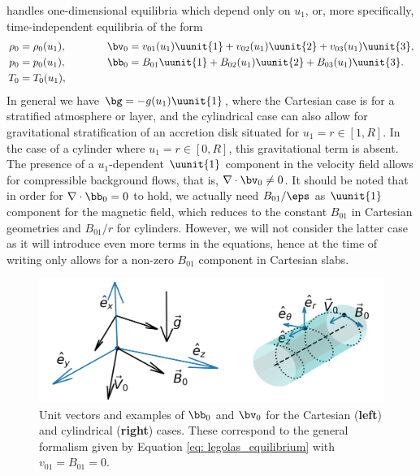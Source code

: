 {\legolas} handles one-dimensional equilibria which depend only on $u_1$, or, more specifically, time-independent equilibria of the form
\begin{equation}	\label{eq: legolas_equilibrium}
	\begin{aligned}
		\rho_0 &= \rho_0(u_1),		\\
		p_0 &= p_0(u_1),			\\
		T_0 &= T_0(u_1),			\\
	\end{aligned}
	\qquad\qquad
	\begin{aligned}
		\bv_0 &= v_{01}(u_1)\uunit{1} + v_{02}(u_1)\uunit{2} + v_{03}(u_1)\uunit{3},	\\
		\bb_0 &= B_{01}\uunit{1} + B_{02}(u_1)\uunit{2} + B_{03}(u_1)\uunit{3}. \\
		&
	\end{aligned}
\end{equation}
In general we have $\bg = -g(u_1)\uunit{1}$, where the Cartesian case is for a stratified atmosphere or layer, and the cylindrical case can also allow for gravitational stratification of an accretion disk situated for $u_1 = r \in [1, R]$. In the case of a cylinder where $u_1 = r \in [0, R]$, this gravitational term is absent. The presence of a $u_1$-dependent $\uunit{1}$ component in the velocity field allows for compressible background flows, that is, $\nabla \cdot \bv_0 \neq 0$. It should be noted that in order for $\nabla \cdot \bb_0 = 0$ to hold, we actually need $B_{01}/\eps$ as $\uunit{1}$ component for the magnetic field, which reduces to the constant $B_{01}$ in Cartesian geometries and $B_{01}/r$ for cylinders. However, we will not consider the latter case as it will introduce even more terms in the equations, hence at the time of writing {\legolas} only allows for a non-zero $B_{01}$ component in Cartesian slabs.

\begin{figure}[t]
  \centering
  \includegraphics[width=\textwidth]{coordinate_axes.png}
  \caption{
    Unit vectors and examples of $\bb_0$ and $\bv_0$ for the Cartesian (\textbf{left}) and cylindrical (\textbf{right}) cases. These correspond to the general formalism given by Equation \eqref{eq: legolas_equilibrium}
    with $v_{01} = B_{01} = 0$.
  }
  \label{fig: coordinate_axes}
\end{figure}

